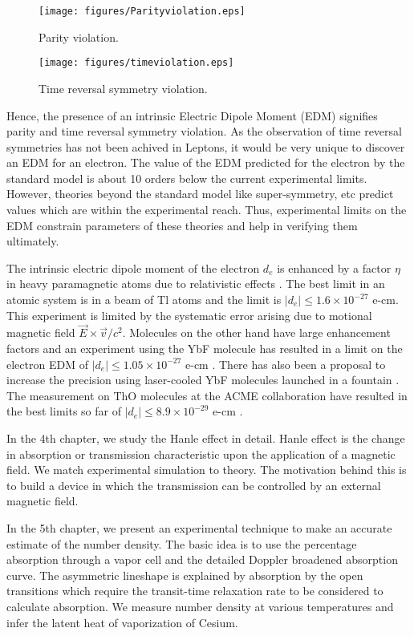 \begin{figure}[H]
\centering
	\texttt{[image: figures/Parityviolation.eps]}
	\caption{\label{fig:Parityviolation}Parity violation.}
\end{figure}

\begin{figure}[H]
\centering
\texttt{[image: figures/timeviolation.eps]}
\caption{\label{fig:Timeviolation}Time reversal symmetry violation.}
\end{figure}

Hence, the presence of an intrinsic Electric Dipole Moment (EDM) signifies parity and time reversal symmetry violation\cite{LAN57}. As the observation of time reversal symmetries has not been achived in Leptons, it would be very unique to discover an EDM for an electron. The value of the EDM predicted for the electron by the standard model is about 10 orders below the current experimental limits. However, theories beyond the standard model like super-symmetry, etc predict values which are within the experimental reach. Thus, experimental limits on the EDM constrain parameters of these theories and help in verifying them ultimately.

The intrinsic electric dipole moment of the electron $d_e$ is enhanced by a factor $\eta$ in heavy paramagnetic atoms due to relativistic effects \cite{SCH63,SAL64}. The best limit in an atomic system is in a beam of Tl atoms \cite{RCS02} and the limit is $|d_e| \leq 1.6 \times 10^{-27}$ e-cm. This experiment is limited by the systematic error arising due to motional magnetic field $\vec{E} \times \vec{v}/c^2 $. Molecules on the other hand have large enhancement factors and an experiment using the YbF molecule has resulted in a limit on the electron EDM of $|d_e| \leq 1.05 \times 10^{-27}$ e-cm \cite{HKS11}. There has also been a proposal to increase the precision using laser-cooled YbF molecules launched in a fountain \cite{TSH13}. The measurement on ThO molecules at the ACME collaboration have resulted in the best limits so far of  $|d_e| \leq 8.9 \times 10^{-29}$ e-cm \cite{ACME14}.

In the 4th chapter, we study the Hanle effect in detail. Hanle effect is the change in absorption or transmission characteristic upon the application of a magnetic field.  We match experimental simulation to theory. The motivation behind this is to build a device in which the transmission can be controlled by an external magnetic field.

In the 5th chapter, we present an experimental technique to make an accurate estimate of the number density. The basic idea is to use the percentage absorption through a vapor cell and the detailed Doppler broadened absorption curve. The asymmetric lineshape is explained by absorption by the open transitions which require the transit-time relaxation rate to be considered to calculate absorption. We measure number density at various temperatures and infer the latent heat of vaporization of Cesium.

